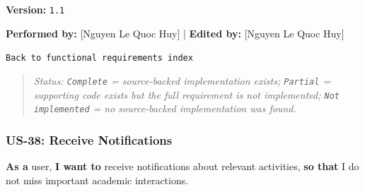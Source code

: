 \documentclass[12pt]{article}
\begin{document}
\textbf{Version:} \texttt{1.1}
\par\medskip

\textbf{Performed by:} [Nguyen Le Quoc Huy] | \textbf{Edited by:} [Nguyen Le Quoc Huy]
\par\medskip

\texttt{Back to functional requirements index}
\par\medskip

\begin{quote}
\textit{Status: \texttt{Complete} = source-backed implementation exists; \texttt{Partial} = supporting code exists but the full requirement is not implemented; \texttt{Not implemented} = no source-backed implementation was found.}
\end{quote}
\par\medskip

\hypertarget{sec:us-38-receive-notifications}{}
\subsubsection*{US-38: Receive Notifications}
\par\medskip

\textbf{As a} user, \textbf{I want to} receive notifications about relevant activities, \textbf{so that} I do not miss important academic interactions.
\par\medskip
\end{document}
